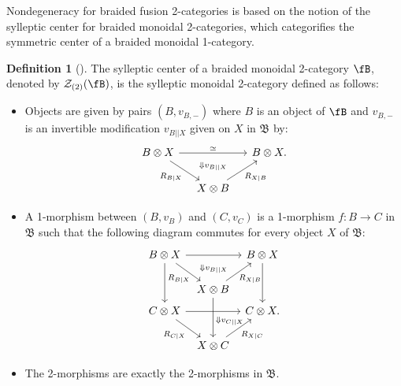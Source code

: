 \documentclass[11pt,reqno]{amsart}
\newcommand{\cZ}{\mathcal{Z}}
\numberwithin{equation}{section}
\theoremstyle{plain}
\theoremstyle{definition}
\newtheorem{defn}[equation]{Definition}
\begin{document}
Nondegeneracy for braided fusion 2-categories is based on the notion of the sylleptic center for braided monoidal 2-categories, which categorifies the symmetric center of a braided monoidal 1-category.

\begin{defn}[\cite{Cr}]\label{def:syllepticcenter}
    The sylleptic center of a braided monoidal 2-category $\fB$, denoted by $\cZ_{(2)}(\fB)$, is the sylleptic monoidal 2-category defined as follows:
    \begin{itemize}
        \item Objects are given by pairs $(B,v_{B,-})$ where $B$ is an object of $\fB$ and $v_{B,-}$ is an invertible modification $v_{B||X}$ given on $X$ in $\mathfrak{B}$ by:
        \begin{equation}
            \begin{tikzcd}[sep=small]
                B\otimes X \arrow[rr, "\simeq", "\Downarrow v_{B||X}"'{yshift=-6pt}] \arrow[rdd,"R_{B|X}",swap]&  & B\otimes X.\\
               & & \\
                & X\otimes B \arrow[ruu,"R_{X|B}",swap]&
            \end{tikzcd}
        \end{equation}
        \item A 1-morphism between $(B,v_B)$ and $(C,v_{C})$ is a 1-morphism $f:B \to C$ in $\mathfrak{B}$ such that the following diagram commutes for every object $X$ of $\mathfrak{B}$:
         \begin{equation}
            \begin{tikzcd}[sep=tiny]
                B\otimes X \arrow[rr, "\Downarrow v_{B||X}"{yshift=-6pt},swap] \arrow[ddd]\arrow[rdd,"R_{B|X}" {xshift=4pt},swap]&  & B\otimes X \arrow[ddd]\\
               & {} & \\
                & X\otimes B \arrow[ruu,"R_{X|B}"{xshift=-2pt},swap] \arrow[ddd, "\Downarrow v_{C||X}"{yshift=-3pt}]& \\
                C\otimes X \arrow[rr] \arrow[rdd,"R_{C|X}",swap]& & C\otimes X. \\
                 & {} & \\
                 & X\otimes C \arrow[ruu,"R_{X|C}",swap]&
            \end{tikzcd}
        \end{equation}
        \item The 2-morphisms are exactly the 2-morphisms in $\mathfrak{B}$.
    \end{itemize}
\end{defn}
\end{document}
